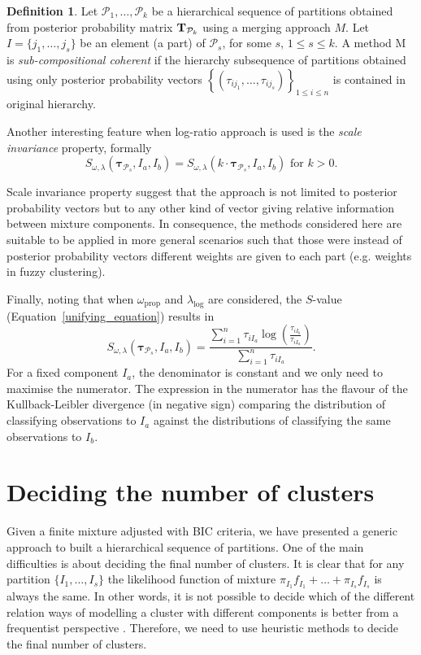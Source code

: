 \documentclass[submit]{smj}
\theoremstyle{definition}
\newtheorem{defn}{Definition}[section]
\newcommand{\m}[1]{\boldsymbol{#1}}
\begin{document}
\begin{defn}
Let $\mathcal{P}_1, \dots, \mathcal{P}_k$ be a hierarchical sequence of partitions obtained from posterior probability matrix $\text{\textbf{T}}_{\mathcal{P}_k}$ using a merging approach $M$. Let $I = \{j_1, \dots, j_s\}$ be an element (a part) of $\mathcal{P}_s$, for some $s$, $1\leq s \leq k$. A method M is \emph{sub-compositional coherent} if the hierarchy subsequence of partitions obtained  using only posterior probability vectors $\left\{ \left(\tau_{ij_1}, \dots, \tau_{ij_s} \right)\right\}_{1\leq i \leq n}$ is contained in original hierarchy.
\end{defn}

Another interesting feature when log-ratio approach is used is the \emph{scale invariance} property, formally
\[
S_{\omega, \lambda}( \m\tau_{\mathcal{P}_s},  I_a,  I_b) = S_{\omega, \lambda}(k\cdot \m\tau_{\mathcal{P}_s},  I_a,  I_b) \text{ for $k>0$.}
\] 

Scale invariance property suggest that the approach is not limited to posterior probability vectors but to any other kind of vector giving relative information between mixture components. In consequence, the methods considered here are suitable to be applied in more general scenarios such that those were instead of posterior probability vectors different weights are given to each part (e.g. weights in fuzzy clustering).

Finally, noting that when $\omega_{\text{prop}}$ and $\lambda_{\log}$ are considered, the $S$-value (Equation~\ref{unifying_equation}) results in
\[
S_{\omega, \lambda}( \m\tau_{\mathcal{P}_s},  I_a,  I_b) = \frac{\sum_{i=1}^n\tau_{iI_a}  \log \left(\frac{ \tau_{iI_b} }{ \tau_{iI_a} }\right)}{\sum_{i=1}^n \tau_{iI_a}}.
\]
For a fixed component $I_a$, the denominator is constant and we only need to maximise the numerator. The expression in the numerator has the flavour of the Kullback-Leibler divergence (in negative sign) comparing the distribution of classifying observations to $I_a$ against the distributions of classifying the same observations to $I_b$.

\section{Deciding the number of clusters}\label{number_clusters}

Given a finite mixture adjusted with BIC criteria, we have presented a generic approach to built a hierarchical sequence of partitions. One of the main difficulties is about deciding the final number of clusters. It is clear that for any partition $\{I_1, \dots, I_{s}\}$ the likelihood function of mixture $\pi_{I_1} f_{I_1} + \dots + \pi_{I_s} f_{I_s}$ is always the same. In other words, it is not possible to decide which of the different relation ways of modelling a cluster with different components is better from a frequentist perspective \citep{hennig2010methods}. Therefore, we need to use heuristic methods to decide the final number of clusters.
\end{document}
